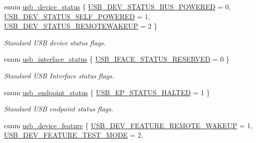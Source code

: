 \begin{DoxyCompactItemize}
enum \hyperlink{group__usb__protocol__group_ga5c6f61a70ef0fda1a1d6f9a34f2f0f1c}{usb\-\_\-device\-\_\-status} \{ \hyperlink{group__usb__protocol__group_gga5c6f61a70ef0fda1a1d6f9a34f2f0f1cabba07ddaf5eb0b763086ab99ed82b59f}{\-U\-S\-B\-\_\-\-D\-E\-V\-\_\-\-S\-T\-A\-T\-U\-S\-\_\-\-B\-U\-S\-\_\-\-P\-O\-W\-E\-R\-E\-D} =  0, 
\hyperlink{group__usb__protocol__group_gga5c6f61a70ef0fda1a1d6f9a34f2f0f1ca762e18607a236d99504f5838e96beb36}{\-U\-S\-B\-\_\-\-D\-E\-V\-\_\-\-S\-T\-A\-T\-U\-S\-\_\-\-S\-E\-L\-F\-\_\-\-P\-O\-W\-E\-R\-E\-D} =  1, 
\hyperlink{group__usb__protocol__group_gga5c6f61a70ef0fda1a1d6f9a34f2f0f1ca9e2a686363488906b279116d3d66103c}{\-U\-S\-B\-\_\-\-D\-E\-V\-\_\-\-S\-T\-A\-T\-U\-S\-\_\-\-R\-E\-M\-O\-T\-E\-W\-A\-K\-E\-U\-P} =  2
 \}
\begin{DoxyCompactList}\small\item\em \-Standard \-U\-S\-B device status flags. \end{DoxyCompactList}\item 
enum \hyperlink{group__usb__protocol__group_ga61c6d9f1bcc6112f394333fac658d627}{usb\-\_\-interface\-\_\-status} \{ \hyperlink{group__usb__protocol__group_gga61c6d9f1bcc6112f394333fac658d627a00df9dc714d093525b1f0163f6625329}{\-U\-S\-B\-\_\-\-I\-F\-A\-C\-E\-\_\-\-S\-T\-A\-T\-U\-S\-\_\-\-R\-E\-S\-E\-R\-V\-E\-D} =  0
 \}
\begin{DoxyCompactList}\small\item\em \-Standard \-U\-S\-B \-Interface status flags. \end{DoxyCompactList}\item 
enum \hyperlink{group__usb__protocol__group_gaf926ff975fcda57f214001b51f15092d}{usb\-\_\-endpoint\-\_\-status} \{ \hyperlink{group__usb__protocol__group_ggaf926ff975fcda57f214001b51f15092dae0ba5849fded7e7ea411f11bd627b040}{\-U\-S\-B\-\_\-\-E\-P\-\_\-\-S\-T\-A\-T\-U\-S\-\_\-\-H\-A\-L\-T\-E\-D} =  1
 \}
\begin{DoxyCompactList}\small\item\em \-Standard \-U\-S\-B endpoint status flags. \end{DoxyCompactList}\item 
enum \hyperlink{group__usb__protocol__group_gab9975b89ad7079085d0300eab037c3ac}{usb\-\_\-device\-\_\-feature} \{ \*
\hyperlink{group__usb__protocol__group_ggab9975b89ad7079085d0300eab037c3aca9d1f5e6a07463ac38743db611c2c414a}{\-U\-S\-B\-\_\-\-D\-E\-V\-\_\-\-F\-E\-A\-T\-U\-R\-E\-\_\-\-R\-E\-M\-O\-T\-E\-\_\-\-W\-A\-K\-E\-U\-P} =  1, 
\hyperlink{group__usb__protocol__group_ggab9975b89ad7079085d0300eab037c3aca6724ffaefab5a3c54b199c4d1ea7b6ff}{\-U\-S\-B\-\_\-\-D\-E\-V\-\_\-\-F\-E\-A\-T\-U\-R\-E\-\_\-\-T\-E\-S\-T\-\_\-\-M\-O\-D\-E} =  2, 

\end{DoxyCompactItemize}
